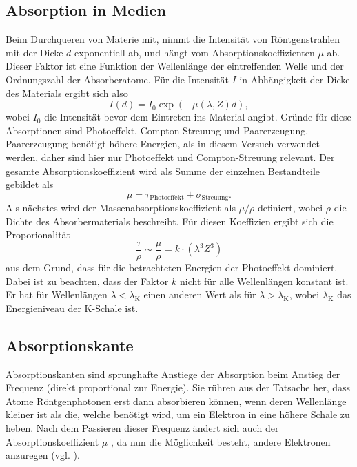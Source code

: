 \subsection{Absorption in Medien}
Beim Durchqueren von Materie mit, nimmt die Intensität von Röntgenstrahlen mit der Dicke $d$ exponentiell ab, und hängt vom Absorptionskoeffizienten $\mu$ ab. Dieser Faktor ist eine Funktion der Wellenlänge der eintreffenden Welle und der Ordnungszahl der Absorberatome. Für die Intensität $I$ in Abhängigkeit der Dicke des Materials ergibt sich also
\begin{equation}\label{eqn:mu}
	I(d)=I_0\exp{(-\mu(\lambda, Z)d)},
\end{equation}
wobei $I_0$ die Intensität bevor dem Eintreten ins Material angibt. 
Gründe für diese Absorptionen sind Photoeffekt, Compton-Streuung und Paarerzeugung. Paarerzeugung benötigt höhere Energien, als in diesem Versuch verwendet werden, daher sind hier nur Photoeffekt und Compton-Streuung relevant. Der gesamte Absorptionskoeffizient wird als Summe der einzelnen Bestandteile gebildet als
\begin{equation}\label{eqn:tau}
	\mu=\tau_{\mathrm{Photoeffekt}}+\sigma_{\mathrm{Streuung}}.
\end{equation}
Als nächstes wird der Massenabsorptionskoeffizient als $\mu/\rho$ definiert, wobei $\rho$ die Dichte des Absorbermaterials beschreibt. Für diesen Koeffizien ergibt sich die Proporionalität
\begin{equation}
	\frac{\tau}{\rho}\sim \frac{\mu}{\rho}=k\cdot(\lambda^3Z^3)
\end{equation}
aus dem Grund, dass für die betrachteten Energien der Photoeffekt dominiert. Dabei ist zu beachten, dass der Faktor $k$ nicht für alle Wellenlängen konstant ist. Er hat für Wellenlängen $\lambda<\lambda_{\mathrm{K}}$ einen anderen Wert als für $\lambda>\lambda_{\mathrm{K}}$, wobei $\lambda_\mathrm{K}$ das Energieniveau der K-Schale ist.
\subsection{Absorptionskante}

Absorptionskanten sind sprunghafte Anstiege der Absorption beim Anstieg der Frequenz (direkt proportional zur Energie). Sie rühren aus der Tatsache her, dass Atome Röntgenphotonen erst dann absorbieren können, wenn deren Wellenlänge kleiner ist als die, welche benötigt wird, um ein Elektron in eine höhere Schale zu heben. Nach dem Passieren dieser Frequenz ändert sich auch der Absorptionskoeffizient $\mu$
, da nun die Möglichkeit besteht, andere Elektronen anzuregen (vgl. \autocite{absorbtionskante}).

